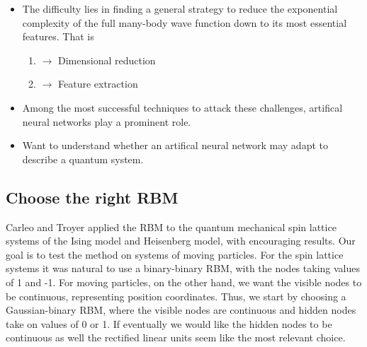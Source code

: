 \documentclass[aip,jcp,reprint,floatfix]{revtex4-1}
\begin{document}
\begin{itemize}
\begin{itemize}
\item The difficulty lies in finding a general strategy to reduce the exponential complexity of the full many-body wave function down to its most essential features. That is
\begin{enumerate}

\item $\rightarrow$ Dimensional reduction

\item $\rightarrow$ Feature extraction

\end{enumerate}

\noindent
\item Among the most successful techniques to attack these challenges, artifical neural networks play a prominent role.

\item Want to understand whether an artifical neural network may adapt to describe a quantum system.
\end{itemize}

\noindent
\subsection*{Choose the right RBM}

Carleo and Troyer applied the RBM to the quantum mechanical spin lattice systems of the Ising model and Heisenberg model, with encouraging results. Our goal is to test the method on systems of moving particles. For the spin lattice systems it was natural to use a binary-binary RBM, with the nodes taking values of 1 and -1. For moving particles, on the other hand, we want the visible nodes to be continuous, representing position coordinates. Thus, we start by choosing a Gaussian-binary RBM, where the visible nodes are continuous and hidden nodes take on values of 0 or 1. If eventually we would like the hidden nodes to be continuous as well the rectified linear units seem like the most relevant choice.


\end{itemize}
\end{document}
